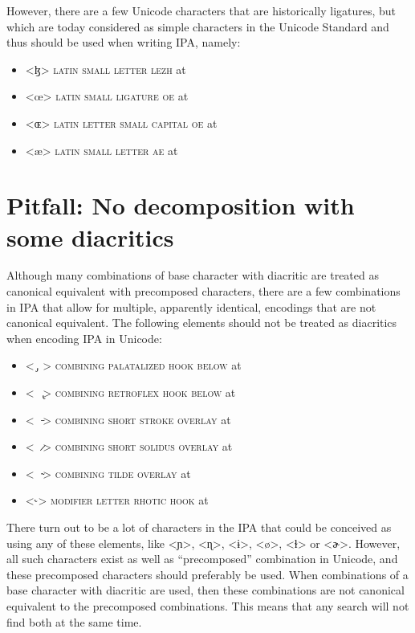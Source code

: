 However, there are a few Unicode characters that are historically ligatures, but
which are today considered as simple characters in the Unicode Standard and thus
should be used when writing IPA, namely:

\begin{itemize}
	\item <ɮ> \textsc{latin small letter lezh} at  
	\item <œ> \textsc{latin small ligature oe} at  
	\item <ɶ> \textsc{latin letter small capital oe} at  
	\item <æ> \textsc{latin small letter ae} at  
\end{itemize}

\section{Pitfall: No decomposition with some diacritics}
\label{pitfall-no-decomposition-of-overlay}

Although many combinations of base character with diacritic are treated as 
canonical equivalent with precomposed characters, there are a few combinations 
in IPA that allow for multiple, apparently identical, encodings that are not 
canonical equivalent. The following elements should not be treated as diacritics 
when encoding IPA in Unicode:
\begin{itemize}
  \item <\ {\large  ̡}\ > \textsc{combining palatalized hook below} at 
  \item <\ \ {\large  ̢}> \textsc{combining retroflex hook below} at 
  \item <\ \ {\large  ̵}> \textsc{combining short stroke overlay} at 
  \item <\ \ {\large  ̷}> \textsc{combining short solidus overlay} at 
  \item <\ \ {\large  ̴}> \textsc{combining tilde overlay} at 
  \item <{\large ˞}> \textsc{modifier letter rhotic hook} at 
\end{itemize} 

There turn out to be a lot of characters in the IPA that could be conceived as 
using any of these elements, like <ɲ>, <ɳ>, <ɨ>, <ø>, <ɫ> or <ɚ>. However, all 
such characters exist as well as ``precomposed'' combination in Unicode, and these 
precomposed characters should preferably be used. When combinations of a base 
character with diacritic are used, then these combinations are not canonical 
equivalent to the precomposed combinations. This means that any search will not 
find both at the same time.

